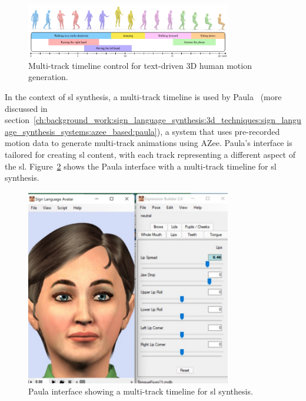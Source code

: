 \documentclass[../../main.tex]{subfiles}
\begin{document}
\begin{figure}
    \centering
    \includegraphics[width=0.8\textwidth]{chapters/multi_track/images/multi_track_other.png}
    \caption{Multi-track timeline control for text-driven 3D human motion generation.}
    \label{fig:multi_track_other}
\end{figure}

In the context of \gls{sl} synthesis, a multi-track timeline is used by Paula~\cite{filhol2017synthesizing} (more discussed in section~\ref{ch:background_work:sign_language_synthesis:3d_techniques:sign_language_synthesis_systems:azee_based:paula}), a system that uses pre-recorded motion data to generate multi-track animations using AZee. Paula's interface is tailored for creating \gls{sl} content, with each track representing a different aspect of the \gls{sl}. Figure~\ref{fig:paula} shows the Paula interface with a multi-track timeline for \gls{sl} synthesis.

\begin{figure}[h]
    \centering
    \includegraphics[width=0.8\textwidth]{chapters/multi_track/images/paula.png}
    \caption{Paula interface showing a multi-track timeline for \gls{sl} synthesis.}
    \label{fig:paula}
\end{figure}
\end{document}
